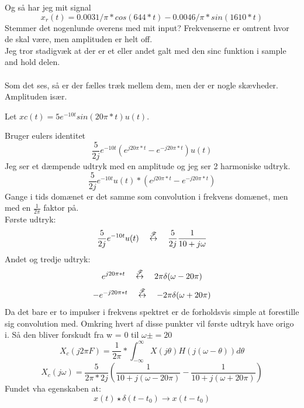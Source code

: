 \begin{Opgaver}
\begin{kapitel}
\begin{Opgave}
\begin{UnderOpgave}
                Og så har jeg mit signal 
                \[x_r(t) = 0.0031/\pi * cos(644*t) - 0.0046/\pi * sin(1610*t)\]
                Stemmer det nogenlunde overens med mit input? Frekvenserne er omtrent hvor de skal være, men amplituden er helt off. \\
                Jeg tror stadigvæk at der er et eller andet galt med den sinc funktion i sample and hold delen. 
                \\\\
                Som det ses, så er der fælles træk mellem dem, men der er nogle skævheder. Amplituden især. 
            \end{UnderOpgave}
        \end{Opgave}
    \end{kapitel}
    \begin{kapitel}
        \begin{Opgave}
            Let $xc(t) = 5e^{-10t}sin(20\pi*t)u(t)$.
            \begin{UnderOpgave}
                Bruger eulers identitet 
                \eulersIdentitetSin
                \[\frac{5}{2j}e^{-10t}(e^{j20\pi*t} - e^{-j20\pi*t})u(t)\]
                Jeg ser et dæmpende udtryk med en amplitude og jeg ser 2 harmoniske udtryk. 
                \[\frac{5}{2j}e^{-10t}u(t) * (e^{j20\pi*t} - e^{-j20\pi*t})\]
                Gange i tids domænet er det samme som convolution i frekvens domænet, men med en $\frac{1}{2\pi}$ faktor på. \\
                Første udtryk: 
                \[\frac{5}{2j}e^{-10t}u(t) \transformation{F} \frac{5}{2j} \frac{1}{10 + j\omega}\]
                Andet og tredje udtryk: 
                \[e^{j20\pi*t} \transformation{F} 2\pi\delta(\omega - 20\pi)\]
                \[-e^{-j20\pi*t} \transformation{F} -2\pi\delta(\omega + 20\pi)\]
                Da det bare er to impulser i frekvens spektret er de forholdsvis simple at forestille sig convolution med. 
                Omkring hvert af disse punkter vil første udtryk have origo i. Så den bliver forskudt fra w = 0 til $\omega \pm = 20$
                \[X_c(j2\pi F) = \frac{1}{2\pi} * \int_{-\infty}^{\infty}{X(j\theta)H(j(\omega - \theta)) d\theta}\]
                \[X_c(j\omega) = \frac{5}{2\pi * 2j} (\frac{1}{10 + j(\omega - 20\pi)} - \frac{1}{10 + j(\omega + 20\pi)})\]
                Fundet vha egenskaben at: 
                \[x(t)\star\delta(t - t_0) \rightarrow x(t - t_0)\]

\end{UnderOpgave}
\end{Opgave}
\end{kapitel}
\end{Opgaver}
